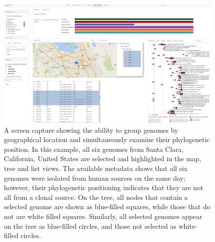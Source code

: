 \documentclass[doublespacing, linenumbers]{bmcart}
\begin{document}
\begin{backmatter}
\newpage
\begin{landscape}
\begin{figure}[h!]
  \includegraphics[width=1\columnwidth]{images/map_tree_california.png}
  \caption{A screen capture showing the ability to group genomes by geographical location and simultaneously examine their phylogenetic position. In this example, all six genomes from Santa Clara, California, United States are selected and highlighted in the map, tree and list views. The available metadata shows that all six genomes were isolated from human sources on the same day; however, their phylogenetic positioning indicates that they are not all from a clonal source.  On the tree, all nodes that contain a selected genome are shown as blue-filled squares, while those that do not are white filled squares. Similarly, all selected genomes appear on the tree as blue-filled circles, and those not selected as white-filled circles.}
  \label{fig:santa_clara}
\end{figure}
\end{landscape}


\end{backmatter}
\end{document}
